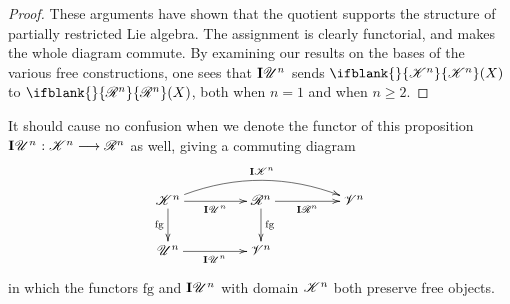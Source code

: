 \documentclass[11pt]{article}
\newcommand{\PRLie}[1]{\scrR^{#1}}%
\newcommand{\LL}[1]{{\scrK}^{#1}}%
\newcommand{\GR}[1]{\scrV^{#1}}%
\newcommand{\nontop}[1]{\scrU^{#1}}%
\newcommand{\Ind}[2][]{\mathbf{I}{#2}_{#1}}%
\newcommand{\forget}{\mathrm{fg}}
\newcommand{\Fr}[2][]{\ifblank{#1}{#2}{#2_{#1}}}
\newcommand{\restn}[2][]{\ifblank{#1}{\xi{#2}}{\xi_{#1}{#2}}}%
\renewcommand{\Q}{Q}
\begin{document}
\begin{DiagramOfFunctors}
\begin{proof}
These arguments have shown that the quotient supports the structure of partially restricted Lie algebra. The assignment is clearly functorial, and makes the whole diagram commute. 
By examining our results on the bases of the various free constructions, one sees that $\Ind{\nontop{n}}$ sends $\Fr{\LL{n}}(X)$ to $\Fr{\PRLie{n}}(X)$, both when $n=1$ and when $n\geq2$.
\end{proof}
\noindent It should cause no confusion when we denote the functor of this proposition $\Ind{\nontop{n}}:\LL{n}\to \PRLie{n}$ as well, giving a commuting diagram
\[\xymatrix@R=8mm@C=15mm@!C{
\LL{n}
\ar@/^1.5em/[rr]^-{\Ind{\LL{n}}}
\ar[d]_-{\forget}
\ar@{->}[r]_-{\Ind{\nontop{n}}}
&%
\PRLie{n}
\ar[d]^-{\forget}
\ar[r]_-{\Ind{\PRLie{n}}}
&%
\GR{n}
\\%
\nontop{n}
\ar[r]_-{\Ind{\nontop{n}}}
&%
\GR{n}
&%
}\]
in which the functors $\forget$ and $\Ind{\nontop{n}}$ with domain $\LL{n}$ both preserve free objects.
%
%
\end{DiagramOfFunctors}
\end{document}
